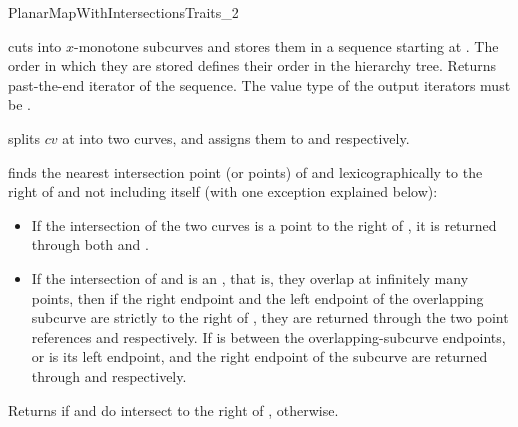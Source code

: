 \begin{ccRefConcept}{PlanarMapWithIntersectionsTraits_2}

	 {cuts  into $x$-monotone subcurves and stores them in a
	  sequence starting at . The order in which they are stored
	  defines their order in the hierarchy tree. Returns past-the-end
	  iterator of the sequence. The value type of the output iterators
          must be .}

         {splits $cv$ at  into two curves, and assigns them to
            and  respectively.
           }

	 {finds the nearest intersection point (or points) of  and
	   lexicographically to the right of  and not 
          including  itself (with one exception explained below):
           \begin{itemize}
           \item If the intersection of the two curves is a point to the
	   right of , it is returned through both  and 
           .
	   \item If the intersection of  and  is an
	   , that is, they overlap at infinitely many
	   points, then if the right endpoint and the left endpoint of the
	   overlapping subcurve are strictly to the right of , they are
	   returned through the two point references  and 
	   respectively. If  is between the overlapping-subcurve
	   endpoints, or  is its left endpoint,  and the right
	   endpoint of the subcurve are returned through  and 
	   respectively.
	   \end{itemize}
	  Returns  if  and  do intersect to the 
          right of ,  otherwise.}


\end{ccRefConcept}
